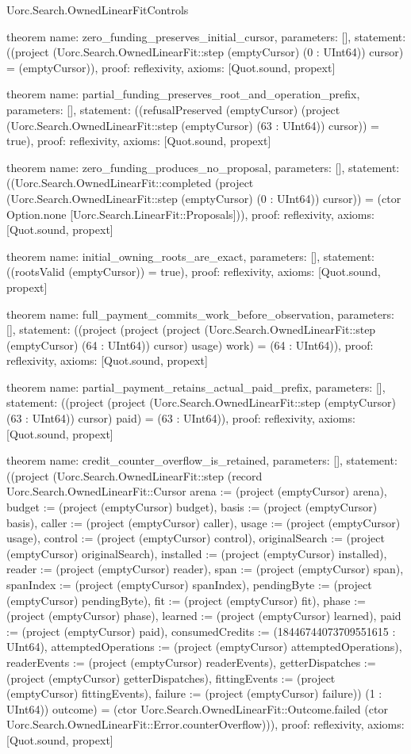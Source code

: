 \begin{lexlean}{Uorc.Search.OwnedLinearFitControls}
\begin{semanticmodule}
theorem{
  name: zero_funding_preserves_initial_cursor,
  parameters: [],
  statement: ((project (Uorc.Search.OwnedLinearFit::step (emptyCursor) (0 : UInt64)) cursor) = (emptyCursor)),
  proof: reflexivity{},
  axioms: [Quot.sound, propext]
}

theorem{
  name: partial_funding_preserves_root_and_operation_prefix,
  parameters: [],
  statement: ((refusalPreserved (emptyCursor) (project (Uorc.Search.OwnedLinearFit::step (emptyCursor) (63 : UInt64)) cursor)) = true),
  proof: reflexivity{},
  axioms: [Quot.sound, propext]
}

theorem{
  name: zero_funding_produces_no_proposal,
  parameters: [],
  statement: ((Uorc.Search.OwnedLinearFit::completed (project (Uorc.Search.OwnedLinearFit::step (emptyCursor) (0 : UInt64)) cursor)) = (ctor Option.none [Uorc.Search.LinearFit::Proposals])),
  proof: reflexivity{},
  axioms: [Quot.sound, propext]
}

theorem{
  name: initial_owning_roots_are_exact,
  parameters: [],
  statement: ((rootsValid (emptyCursor)) = true),
  proof: reflexivity{},
  axioms: [Quot.sound, propext]
}

theorem{
  name: full_payment_commits_work_before_observation,
  parameters: [],
  statement: ((project (project (project (Uorc.Search.OwnedLinearFit::step (emptyCursor) (64 : UInt64)) cursor) usage) work) = (64 : UInt64)),
  proof: reflexivity{},
  axioms: [Quot.sound, propext]
}

theorem{
  name: partial_payment_retains_actual_paid_prefix,
  parameters: [],
  statement: ((project (project (Uorc.Search.OwnedLinearFit::step (emptyCursor) (63 : UInt64)) cursor) paid) = (63 : UInt64)),
  proof: reflexivity{},
  axioms: [Quot.sound, propext]
}

theorem{
  name: credit_counter_overflow_is_retained,
  parameters: [],
  statement: ((project (Uorc.Search.OwnedLinearFit::step (record Uorc.Search.OwnedLinearFit::Cursor {arena := (project (emptyCursor) arena), budget := (project (emptyCursor) budget), basis := (project (emptyCursor) basis), caller := (project (emptyCursor) caller), usage := (project (emptyCursor) usage), control := (project (emptyCursor) control), originalSearch := (project (emptyCursor) originalSearch), installed := (project (emptyCursor) installed), reader := (project (emptyCursor) reader), span := (project (emptyCursor) span), spanIndex := (project (emptyCursor) spanIndex), pendingByte := (project (emptyCursor) pendingByte), fit := (project (emptyCursor) fit), phase := (project (emptyCursor) phase), learned := (project (emptyCursor) learned), paid := (project (emptyCursor) paid), consumedCredits := (18446744073709551615 : UInt64), attemptedOperations := (project (emptyCursor) attemptedOperations), readerEvents := (project (emptyCursor) readerEvents), getterDispatches := (project (emptyCursor) getterDispatches), fittingEvents := (project (emptyCursor) fittingEvents), failure := (project (emptyCursor) failure)}) (1 : UInt64)) outcome) = (ctor Uorc.Search.OwnedLinearFit::Outcome.failed (ctor Uorc.Search.OwnedLinearFit::Error.counterOverflow))),
  proof: reflexivity{},
  axioms: [Quot.sound, propext]
}


\end{semanticmodule}
\end{lexlean}
